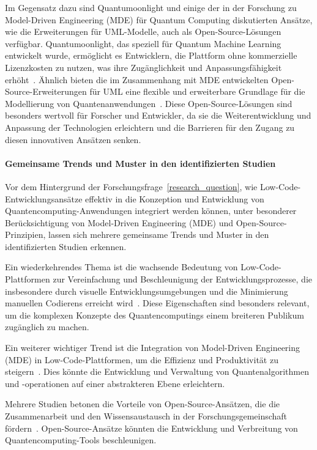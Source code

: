 Im Gegensatz dazu sind Quantumoonlight und einige der in der Forschung zu Model-Driven Engineering (MDE) für Quantum Computing 
diskutierten Ansätze, wie die Erweiterungen für UML-Modelle, auch als Open-Source-Lösungen verfügbar. Quantumoonlight, das speziell 
für Quantum Machine Learning entwickelt wurde, ermöglicht es Entwicklern, die Plattform ohne kommerzielle Lizenzkosten zu nutzen, 
was ihre Zugänglichkeit und Anpassungsfähigkeit erhöht~\cite{Amato_2023}. Ähnlich bieten die im Zusammenhang mit MDE entwickelten 
Open-Source-Erweiterungen für UML eine flexible und erweiterbare Grundlage für die Modellierung von Quantenanwendungen~\cite{gemeinhardt2021towards}. 
Diese Open-Source-Lösungen sind besonders wertvoll für Forscher und Entwickler, da sie die Weiterentwicklung und Anpassung der 
Technologien erleichtern und die Barrieren für den Zugang zu diesen innovativen Ansätzen senken.

% 

\paragraph{Gemeinsame Trends und Muster in den identifizierten Studien}

Vor dem Hintergrund der Forschungsfrage~\ref{research_question}, wie Low-Code-Entwicklungsansätze effektiv in die Konzeption 
und Entwicklung von Quantencomputing-Anwendungen integriert werden können, unter besonderer Berücksichtigung 
von Model-Driven Engineering (MDE) und Open-Source-Prinzipien, lassen sich mehrere gemeinsame Trends und 
Muster in den identifizierten Studien erkennen.

Ein wiederkehrendes Thema ist die wachsende Bedeutung von Low-Code-Plattformen zur Vereinfachung und 
Beschleunigung der Entwicklungsprozesse, die insbesondere durch visuelle Entwicklungsumgebungen und 
die Minimierung manuellen Codierens erreicht wird~\cite{Khorram_2020, Sahay_2020, Bock_2021}. Diese 
Eigenschaften sind besonders relevant, um die komplexen Konzepte des Quantencomputings einem breiteren Publikum zugänglich zu machen.

Ein weiterer wichtiger Trend ist die Integration von Model-Driven Engineering (MDE) in Low-Code-Plattformen, 
um die Effizienz und Produktivität zu steigern~\cite{Gemeinhardt_2021, Moin_2021, Perez-Castillo_2022}. 
Dies könnte die Entwicklung und Verwaltung von Quantenalgorithmen und -operationen auf einer abstrakteren Ebene erleichtern.

Mehrere Studien betonen die Vorteile von Open-Source-Ansätzen, die die Zusammenarbeit und den Wissensaustausch 
in der Forschungsgemeinschaft fördern~\cite{Amato_2023, Gemeinhardt_2023}. Open-Source-Ansätze könnten die 
Entwicklung und Verbreitung von Quantencomputing-Tools beschleunigen.

